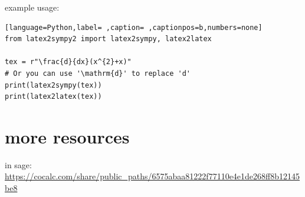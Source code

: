\documentclass[a4paper,12pt]{article}
\begin{document}
example usage:\\[0pt]

\begin{lstlisting}[language=Python,label= ,caption= ,captionpos=b,numbers=none]
from latex2sympy2 import latex2sympy, latex2latex

tex = r"\frac{d}{dx}(x^{2}+x)"
# Or you can use '\mathrm{d}' to replace 'd'
print(latex2sympy(tex))
print(latex2latex(tex))
\end{lstlisting}
\section{more resources}
\label{sec:orga1e193a}
in sage: \url{https://cocalc.com/share/public\_paths/6575abaa81222f77110e4e1de268ff8b12145be8}\\[0pt]
\end{document}
